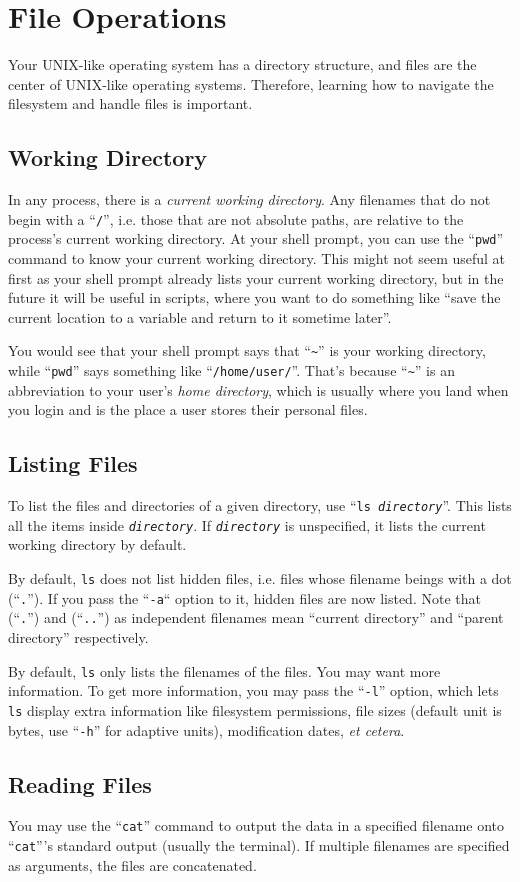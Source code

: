 \documentclass{extbook}
\newcommand\ph[1]{\texttt{\textit{#1}}}
\begin{document}
\section{File Operations}

Your UNIX-like operating system has a directory structure, and files are the center of UNIX-like operating systems.  Therefore, learning how to navigate the filesystem and handle files is important.

\subsection{Working Directory}

In any process, there is a \textit{current working directory}.  Any filenames that do not begin with a ``\verb|/|'', i.e. those that are not absolute paths, are relative to the process's current working directory.  At your shell prompt, you can use the ``\verb|pwd|'' command to know your current working directory.  This might not seem useful at first as your shell prompt already lists your current working directory, but in the future it will be useful in scripts, where you want to do something like ``save the current location to a variable and return to it sometime later''.

You would see that your shell prompt says that ``\verb|~|'' is your working directory, while ``\verb|pwd|'' says something like ``\verb|/home/user/|''.  That's because ``\verb|~|'' is an abbreviation to your user's \textit{home directory}, which is usually where you land when you login and is the place a user stores their personal files.

\subsection{Listing Files}

To list the files and directories of a given directory, use ``\texttt{ls \ph{directory}}''.  This lists all the items inside \ph{directory}.  If \ph{directory} is unspecified, it lists the current working directory by default.

By default, \verb|ls| does not list hidden files, i.e. files whose filename beings with a dot (``\verb|.|'').  If you pass the ``\verb|-a|`` option to it, hidden files are now listed.  Note that (``\verb|.|'') and (``\verb|..|'') as independent filenames mean ``current directory'' and ``parent directory'' respectively.

By default, \verb|ls| only lists the filenames of the files.  You may want more information.  To get more information, you may pass the ``\verb|-l|'' option, which lets \verb|ls| display extra information like filesystem permissions, file sizes (default unit is bytes, use ``\verb|-h|'' for adaptive units), modification dates, \textit{et cetera}.

\subsection{Reading Files}

You may use the ``\verb|cat|'' command to output the data in a specified filename onto ``\verb|cat|'''s standard output (usually the terminal).  If multiple filenames are specified as arguments, the files are concatenated.
\end{document}
